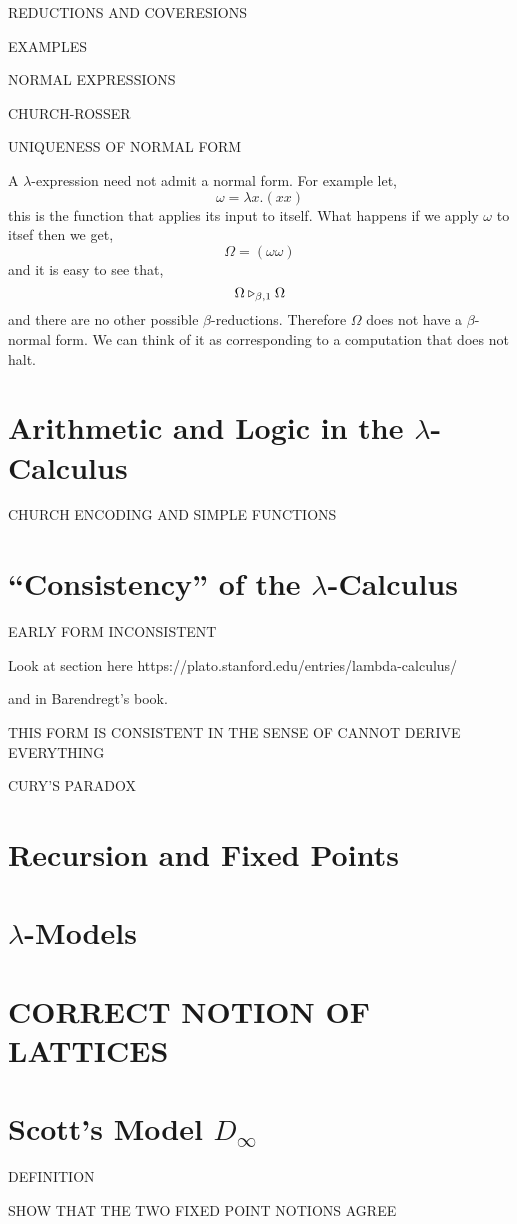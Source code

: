 \documentclass[12pt]{article}
\begin{document}
\begin{defn}
REDUCTIONS AND COVERESIONS
\end{defn}

EXAMPLES

NORMAL EXPRESSIONS 

CHURCH-ROSSER 

UNIQUENESS OF NORMAL FORM

\begin{example}
A $\lambda$-expression need not admit a normal form. For example let,
\[ \omega = \lambda x . (x x) \]
this is the function that applies its input to itself. What happens if we apply $\omega$ to itsef then we get,
\[ \Omega = (\omega \omega) \]
and it is easy to see that,
\[ \Omega \triangleright_{\beta,1} \Omega \]
and there are no other possible $\beta$-reductions. Therefore $\Omega$ does not have a $\beta$-normal form. We can think of it as corresponding to a computation that does not halt.
\end{example}

\section{Arithmetic and Logic in the $\lambda$-Calculus}

CHURCH ENCODING AND SIMPLE FUNCTIONS

\section{``Consistency'' of the $\lambda$-Calculus}

EARLY FORM INCONSISTENT

Look at section here https://plato.stanford.edu/entries/lambda-calculus/

and in Barendregt's book. 

THIS FORM IS CONSISTENT IN THE SENSE OF CANNOT DERIVE EVERYTHING

CURY'S PARADOX

\section{Recursion and Fixed Points}

\section{$\lambda$-Models}

\section{CORRECT NOTION OF LATTICES}

\section{Scott's Model $D_{\infty}$}

DEFINITION

SHOW THAT THE TWO FIXED POINT NOTIONS AGREE
\end{document}

